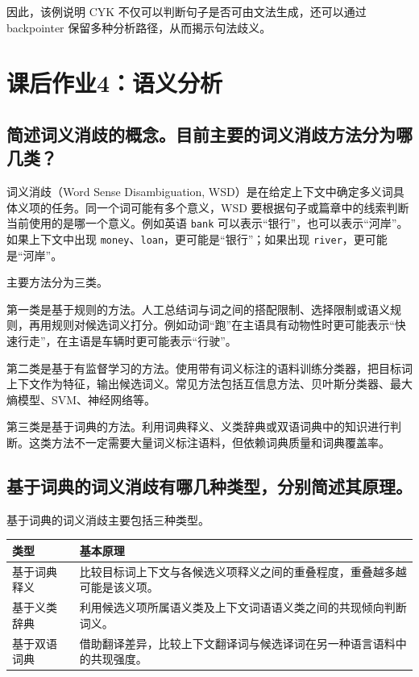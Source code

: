 因此，该例说明 CYK 不仅可以判断句子是否可由文法生成，还可以通过 backpointer 保留多种分析路径，从而揭示句法歧义。

\section{课后作业4：语义分析}

\subsection{简述词义消歧的概念。目前主要的词义消歧方法分为哪几类？}

词义消歧（Word Sense Disambiguation, WSD）是在给定上下文中确定多义词具体义项的任务。同一个词可能有多个意义，WSD 要根据句子或篇章中的线索判断当前使用的是哪一个意义。例如英语 \texttt{bank} 可以表示“银行”，也可以表示“河岸”。如果上下文中出现 \texttt{money}、\texttt{loan}，更可能是“银行”；如果出现 \texttt{river}，更可能是“河岸”。

主要方法分为三类。

第一类是基于规则的方法。人工总结词与词之间的搭配限制、选择限制或语义规则，再用规则对候选词义打分。例如动词“跑”在主语具有动物性时更可能表示“快速行走”，在主语是车辆时更可能表示“行驶”。

第二类是基于有监督学习的方法。使用带有词义标注的语料训练分类器，把目标词上下文作为特征，输出候选词义。常见方法包括互信息方法、贝叶斯分类器、最大熵模型、SVM、神经网络等。

第三类是基于词典的方法。利用词典释义、义类辞典或双语词典中的知识进行判断。这类方法不一定需要大量词义标注语料，但依赖词典质量和词典覆盖率。

\subsection{基于词典的词义消歧有哪几种类型，分别简述其原理。}

基于词典的词义消歧主要包括三种类型。

\begin{table}[H]
\centering
\small
\begin{tabular}{|p{}|p{}|}
\hline
类型 & 基本原理 \\ \hline
基于词典释义 & 比较目标词上下文与各候选义项释义之间的重叠程度，重叠越多越可能是该义项。 \\ \hline
基于义类辞典 & 利用候选义项所属语义类及上下文词语语义类之间的共现倾向判断词义。 \\ \hline
基于双语词典 & 借助翻译差异，比较上下文翻译词与候选译词在另一种语言语料中的共现强度。 \\ \hline
\end{tabular}
\end{table}

